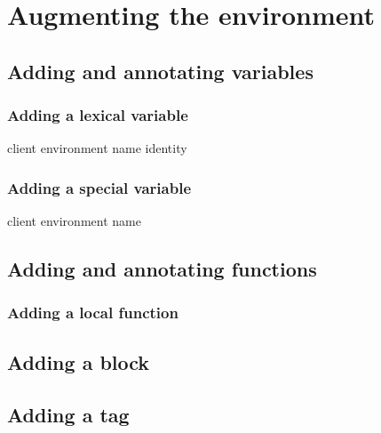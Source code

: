 \chapter{Augmenting the environment}

\section{Adding and annotating variables}

\subsection{Adding a lexical variable}

 {client environment name \optional identity}

\subsection{Adding a special variable}

 {client environment name}

\section{Adding and annotating functions}

\subsection{Adding a local function}

\section{Adding a block}

\section{Adding a tag}

